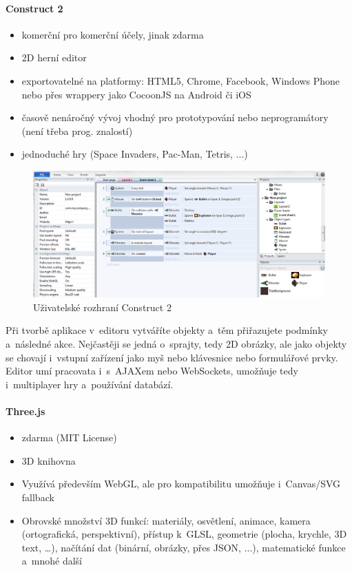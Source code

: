 \documentclass[12pt,a4paper,titlepage,final]{report}
\begin{document}
\paragraph{Construct 2}  \cite{construct2}

\begin{itemize}
	\item komerční pro komerční účely, jinak zdarma
	\item 2D herní editor
	\item exportovatelné na platformy: HTML5, Chrome, Facebook, Windows Phone nebo přes wrappery jako CocoonJS na Android či iOS
	\item časově nenáročný vývoj vhodný pro prototypování nebo neprogramátory (není třeba prog. znalostí)
	\item jednoduché hry (Space Invaders, Pac-Man, Tetris, ...)
\end{itemize}

\begin{figure}[ht]
\begin{center}
\includegraphics[width=14cm]{images/construct2.jpg}
\caption{Uživatelské rozhraní Construct 2}
\label{fig:theory}
\end{center}
\end{figure}

Při tvorbě aplikace v~editoru vytváříte objekty a~těm přiřazujete podmínky a~následné akce. Nejčastěji se jedná o~sprajty, tedy 2D obrázky, ale jako objekty se chovají i~vstupní zařízení jako myš nebo klávesnice nebo formulářové prvky. Editor umí pracovata i~s~AJAXem nebo WebSockets, umožňuje tedy i~multiplayer hry a~používání databází.

\paragraph{Three.js} \cite{threejs}

\begin{itemize}
	\item zdarma (MIT License)
	\item 3D knihovna
	\item Využívá především WebGL, ale pro kompatibilitu umožňuje i~Canvas/SVG fallback
	\item Obrovské množství 3D funkcí: materiály, osvětlení, animace, kamera (ortografická, perspektivní), přístup k~GLSL, geometrie (plocha, krychle, 3D text, \dots), načítání dat (binární, obrázky, přes JSON, ...), matematické funkce a~mnohé další	
\end{itemize}
\end{document}
